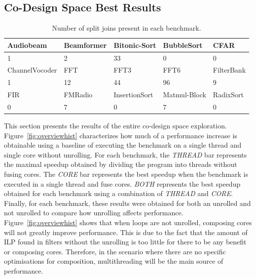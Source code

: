 \subsection{Co-Design Space Best Results}

\begin{table}[!htb]
  \small
 \begin{tabular} { | l | l | l | l | l | }
 \hline
   \cellcolor[gray]{0.7}Audiobeam&  \cellcolor[gray]{0.7} Beamformer& \cellcolor[gray]{0.7}Bitonic-Sort  &  \cellcolor[gray]{0.7} BubbleSort &  \cellcolor[gray]{0.7}  CFAR\\ \hline
  1 & 2 & 33 & 0 & 0 \\ \hline
   \cellcolor[gray]{0.7}ChannelVocoder &  \cellcolor[gray]{0.7} FFT&  \cellcolor[gray]{0.7}FFT3 &  \cellcolor[gray]{0.7} FFT6&  \cellcolor[gray]{0.7}FilterBank \\ \hline
  1 & 12 & 44 & 96 & 9 \\ \hline 
   \cellcolor[gray]{0.7}FIR &  \cellcolor[gray]{0.7} FMRadio &  \cellcolor[gray]{0.7} InsertionSort &  \cellcolor[gray]{0.7} Matmul-Block &  \cellcolor[gray]{0.7} RadixSort\\ \hline
  0 & 7 & 0 & 7 & 0 \\ \hline
 \end{tabular}
  \caption{Number of split joins present in each benchmark.}\label{tab:splitjoin}
\end{table}

This section  presents the results of the entire co-design space exploration.
Figure~\ref{fig:overviewhist} characterizes how much of a performance increase is obtainable using a baseline of executing the benchmark on a single thread and single core without unrolling.
For each benchmark, the \textit{THREAD} bar represents the maximal speedup obtained by dividing the program into threads without fusing cores.
The \textit{CORE} bar represents the best speedup when the benchmark is executed in a single thread and fuse cores.
\textit{BOTH} represents the best speedup obtained for each benchmark using a combination of \textit{THREAD} and \textit{CORE}.
Finally, for each benchmark, these results were obtained for both an unrolled and not unrolled to compare how unrolling affects performance.
Figure~\ref{fig:overviewhist} shows that when loops are not unrolled, composing cores will not greatly improve performance.
This is due to the fact that the amount of ILP found in filters without the unrolling is too little for there to be any benefit or composing cores.
Therefore, in the scenario where there are no specific optimisations for composition, multithreading will be the main source of performance.

